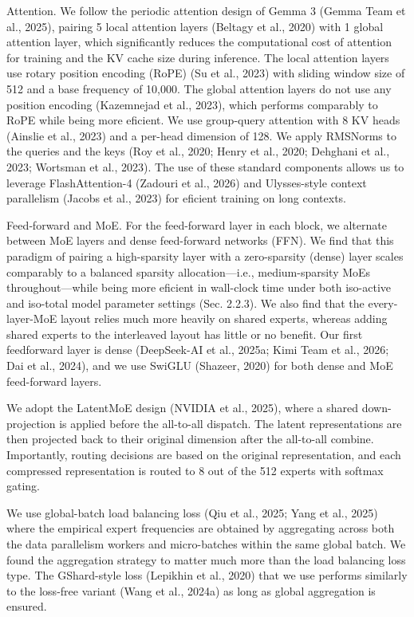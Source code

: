 \documentclass[
  10
]{article}
\begin{document}
Attention. We follow the periodic attention design of Gemma 3 (Gemma
Team et al., 2025), pairing 5 local attention layers (Beltagy et al.,
2020) with 1 global attention layer, which significantly reduces the
computational cost of attention for training and the KV cache size
during inference. The local attention layers use rotary position
encoding (RoPE) (Su et al., 2023) with sliding window size of 512 and a
base frequency of 10,000. The global attention layers do not use any
position encoding (Kazemnejad et al., 2023), which performs comparably
to RoPE while being more eficient. We use group-query attention with 8
KV heads (Ainslie et al., 2023) and a per-head dimension of 128. We
apply RMSNorms to the queries and the keys (Roy et al., 2020; Henry et
al., 2020; Dehghani et al., 2023; Wortsman et al., 2023). The use of
these standard components allows us to leverage FlashAttention-4
(Zadouri et al., 2026) and Ulysses-style context parallelism (Jacobs et
al., 2023) for eficient training on long contexts.

Feed‐forward and MoE. For the feed-forward layer in each block, we
alternate between MoE layers and dense feed-forward networks (FFN). We
find that this paradigm of pairing a high-sparsity layer with a
zero-sparsity (dense) layer scales comparably to a balanced sparsity
allocation---i.e., medium-sparsity MoEs throughout---while being more
eficient in wall-clock time under both iso-active and iso-total model
parameter settings (Sec. 2.2.3). We also find that the every-layer-MoE
layout relies much more heavily on shared experts, whereas adding shared
experts to the interleaved layout has little or no benefit. Our first
feedforward layer is dense (DeepSeek-AI et al., 2025a; Kimi Team et al.,
2026; Dai et al., 2024), and we use SwiGLU (Shazeer, 2020) for both
dense and MoE feed-forward layers.

We adopt the LatentMoE design (NVIDIA et al., 2025), where a shared
down-projection is applied before the all-to-all dispatch. The latent
representations are then projected back to their original dimension
after the all-to-all combine. Importantly, routing decisions are based
on the original representation, and each compressed representation is
routed to 8 out of the 512 experts with softmax gating.

We use global-batch load balancing loss (Qiu et al., 2025; Yang et al.,
2025) where the empirical expert frequencies are obtained by aggregating
across both the data parallelism workers and micro-batches within the
same global batch. We found the aggregation strategy to matter much more
than the load balancing loss type. The GShard-style loss (Lepikhin et
al., 2020) that we use performs similarly to the loss-free variant (Wang
et al., 2024a) as long as global aggregation is ensured.
\end{document}
